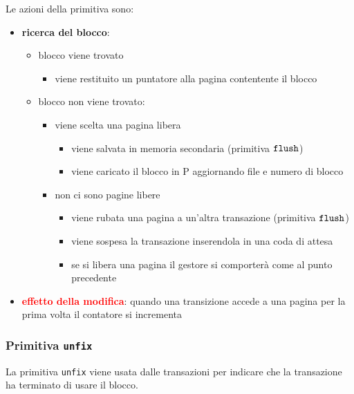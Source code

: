 Le azioni della primitiva sono:
\begin{itemize}[label=$\triangleright$, itemsep=\medskipamount]
  \item \textbf{ricerca del blocco}:
  \begin{itemize}[label=$\diamond$, itemsep=\medskipamount]
    \item blocco viene trovato
    \begin{itemize}[label=$\Rightarrow$, itemsep=\smallskipamount]
      \item viene restituito un puntatore alla pagina contentente il blocco
    \end{itemize}
    \item blocco non viene trovato:
    \begin{itemize}[label=$\circ$, itemsep=\smallskipamount]
      \item viene scelta una pagina libera
      \begin{itemize}[label=$\Rightarrow$, itemsep=\smallskipamount]
        \item viene salvata in memoria secondaria (primitiva $\verb|flush|$)
        \item viene caricato il blocco in P aggiornando file e numero di blocco
      \end{itemize}
      \item non ci sono pagine libere
      \begin{itemize}[label=$\Rightarrow$, itemsep=\smallskipamount]
        \item viene rubata una pagina a un'altra transazione (primitiva $\verb|flush|$)
        \item viene sospesa la transazione inserendola in una coda di attesa
        \item se si libera una pagina il gestore si comporterà come al punto precedente
      \end{itemize}
    \end{itemize}
  \end{itemize}
\end{itemize}
\medskip
\begin{itemize}[label=$\Rightarrow$]
  \item \textcolor{red}{\textbf{effetto della modifica}}: quando una transizione accede a una pagina per la prima volta il contatore si incrementa
\end{itemize}

\subsubsection{Primitiva \protect\texttt{unfix}}
La \textcolor{azzurrino}{primitiva \texttt{unfix}} viene usata dalle transazioni per indicare che la transazione ha terminato di usare il blocco.

